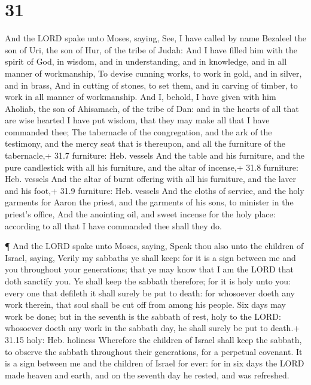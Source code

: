 \hypertarget{section-30}{%
\section{31}\label{section-30}}

 And the LORD spake unto Moses, saying,  See, I
have called by name Bezaleel the son of Uri, the son of Hur, of the
tribe of Judah:  And I have filled him with the spirit of
God, in wisdom, and in understanding, and in knowledge, and in all
manner of workmanship,  To devise cunning works, to work in
gold, and in silver, and in brass,  And in cutting of
stones, to set them, and in carving of timber, to work in all manner of
workmanship.  And I, behold, I have given with him Aholiab,
the son of Ahisamach, of the tribe of Dan: and in the hearts of all that
are wise hearted I have put wisdom, that they may make all that I have
commanded thee;  The tabernacle of the congregation, and the
ark of the testimony, and the mercy seat that is thereupon, and all the
furniture of the tabernacle,+ 31.7 furniture: Heb. vessels 
And the table and his furniture, and the pure candlestick with all his
furniture, and the altar of incense,+ 31.8 furniture: Heb. vessels
 And the altar of burnt offering with all his furniture, and
the laver and his foot,+ 31.9 furniture: Heb. vessels  And
the cloths of service, and the holy garments for Aaron the priest, and
the garments of his sons, to minister in the priest's office,
 And the anointing oil, and sweet incense for the holy
place: according to all that I have commanded thee shall they do.

 ¶ And the LORD spake unto Moses, saying, 
Speak thou also unto the children of Israel, saying, Verily my sabbaths
ye shall keep: for it is a sign between me and you throughout your
generations; that ye may know that I am the LORD that doth sanctify you.
 Ye shall keep the sabbath therefore; for it is holy unto
you: every one that defileth it shall surely be put to death: for
whosoever doeth any work therein, that soul shall be cut off from among
his people.  Six days may work be done; but in the seventh
is the sabbath of rest, holy to the LORD: whosoever doeth any work in
the sabbath day, he shall surely be put to death.+ 31.15 holy: Heb.
holiness  Wherefore the children of Israel shall keep the
sabbath, to observe the sabbath throughout their generations, for a
perpetual covenant.  It is a sign between me and the
children of Israel for ever: for in six days the LORD made heaven and
earth, and on the seventh day he rested, and was refreshed.

